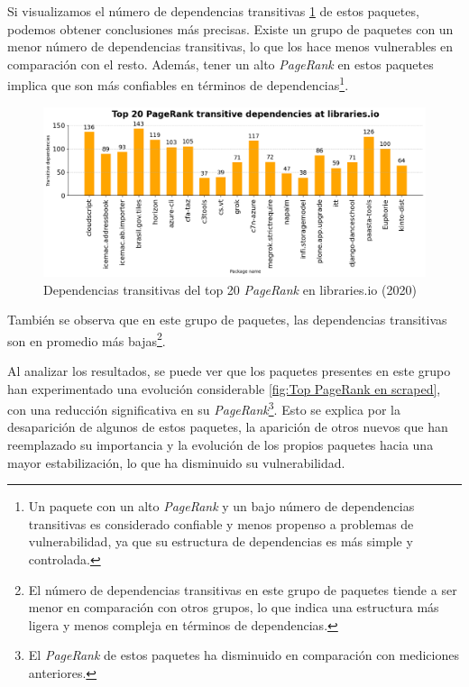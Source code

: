 Si visualizamos el número de dependencias transitivas \ref{fig:Dependencias transitivas del top 20 pagerank en libraries.io}
de estos paquetes, podemos obtener conclusiones más precisas.
Existe un grupo de paquetes con un menor número de dependencias transitivas, lo que los hace menos vulnerables en
comparación con el resto. Además, tener un alto \textit{PageRank} en estos paquetes implica que son más confiables
en términos de dependencias\footnote{Un paquete con un alto \textit{PageRank} y un bajo número de dependencias
    transitivas es considerado confiable y menos propenso a problemas de vulnerabilidad, ya que su estructura de
    dependencias es más simple y controlada.}.

\begin{figure}[h!]
    \begin{center}
        \includegraphics[width=1\textwidth]{img/pypi/transitive libraries.png}
        \caption{Dependencias transitivas del top 20 \textit{PageRank} en libraries.io (2020)}
        \label{fig:Dependencias transitivas del top 20 pagerank en libraries.io}
    \end{center}
\end{figure}

También se observa que en este grupo de paquetes, las dependencias transitivas son en promedio
más bajas\footnote{El número de dependencias transitivas en este grupo de paquetes tiende a
    ser menor en comparación con otros grupos, lo que indica una estructura más ligera y menos
    compleja en términos de dependencias.}.

Al analizar los resultados, se puede ver que los paquetes presentes en este grupo han
experimentado una evolución considerable \ref{fig:Top PageRank en scraped}, con una reducción significativa en
su \textit{PageRank}\footnote{El \textit{PageRank} de estos paquetes ha disminuido
    en comparación con mediciones anteriores.}. Esto se explica por la desaparición de algunos
de estos paquetes, la aparición de otros nuevos que han reemplazado su importancia y
la evolución de los propios paquetes hacia una mayor estabilización, lo que ha disminuido
su vulnerabilidad.

